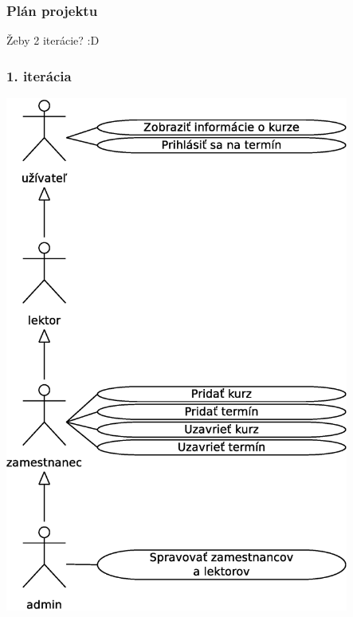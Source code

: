 \documentclass[12pt,a4paper,titlepage,final]{report}
\begin{document}
	\subsubsection{Plán projektu}
Žeby 2 iterácie? :D
	\subsubsection{1. iterácia}
		\begin{center}
			\captionsetup{type=figure}
			\includegraphics[height=17cm]{img/use_case_iter1.eps}
		\end{center}
\end{document}
